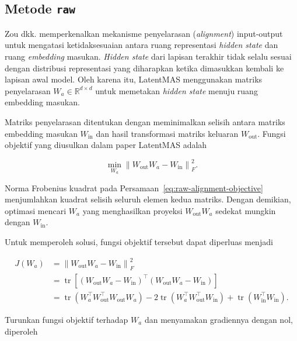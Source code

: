 \subsection{Metode \texttt{raw}}
\label{subsec:metode-raw}

Zou dkk. \citep{latentmas} memperkenalkan mekanisme penyelarasan (\textit{alignment}) input-output untuk mengatasi ketidaksesuaian antara ruang representasi \textit{hidden state} dan ruang \textit{embedding} masukan. \textit{Hidden state} dari lapisan terakhir tidak selalu sesuai dengan distribusi representasi yang diharapkan ketika dimasukkan kembali ke lapisan awal model. Oleh karena itu, LatentMAS menggunakan matriks penyelarasan $W_a\in\mathbb{R}^{d\times d}$ untuk memetakan \textit{hidden state} menuju ruang embedding masukan.

Matriks penyelarasan ditentukan dengan meminimalkan selisih antara matriks embedding masukan $W_{\mathrm{in}}$ dan hasil transformasi matriks keluaran $W_{\mathrm{out}}$. Fungsi objektif yang diusulkan dalam paper LatentMAS adalah

\begin{equation}
\min_{W_a}
\left\|
W_{\mathrm{out}}W_a-W_{\mathrm{in}}
\right\|_F^2.
\label{eq:raw-alignment-objective}
\end{equation}

Norma Frobenius kuadrat pada Persamaan~\eqref{eq:raw-alignment-objective} menjumlahkan kuadrat selisih seluruh elemen kedua matriks. Dengan demikian, optimasi mencari $W_a$ yang menghasilkan proyeksi $W_{\mathrm{out}}W_a$ sedekat mungkin dengan $W_{\mathrm{in}}$.

Untuk memperoleh solusi, fungsi objektif tersebut dapat diperluas menjadi

\begin{align}
J(W_a)
&=
\left\|
W_{\mathrm{out}}W_a-W_{\mathrm{in}}
\right\|_F^2 \\
&=
\operatorname{tr}
\left[
\left(W_{\mathrm{out}}W_a-W_{\mathrm{in}}\right)^\top
\left(W_{\mathrm{out}}W_a-W_{\mathrm{in}}\right)
\right] \\
&=
\operatorname{tr}
\left(W_a^\top W_{\mathrm{out}}^\top W_{\mathrm{out}}W_a\right)
-
2\operatorname{tr}
\left(W_a^\top W_{\mathrm{out}}^\top W_{\mathrm{in}}\right)
+
\operatorname{tr}
\left(W_{\mathrm{in}}^\top W_{\mathrm{in}}\right).
\label{eq:raw-alignment-trace}
\end{align}

Turunkan fungsi objektif terhadap $W_a$ dan menyamakan gradiennya dengan nol, diperoleh

